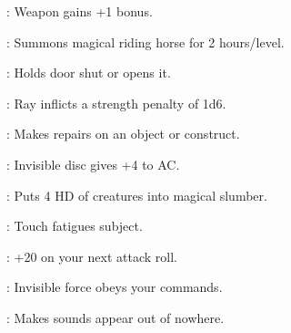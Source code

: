 \begin{list}{}{\leftmargin=1em}
\item {}: Weapon gains +1 bonus.
\item {}: Summons magical riding horse for 2 hours/level.
\item {}: Holds door shut or opens it.
\item {}: Ray inflicts a strength penalty of 1d6.
\item {}: Makes repairs on an object or construct.
\item {}: Invisible disc gives +4 to AC.
\item {}: Puts 4 HD of creatures into magical slumber.
\item {}: Touch fatigues subject.
\item {}: +20 on your next attack roll.
\item {}: Invisible force obeys your commands.
\item {}: Makes sounds appear out of nowhere.
\end{list}
